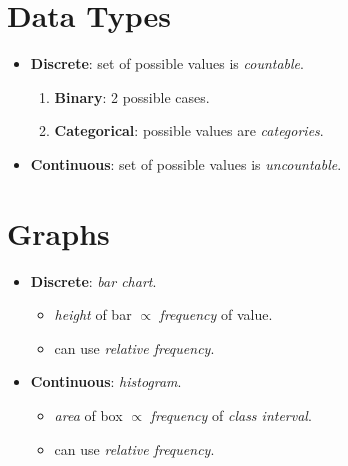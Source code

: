 \section*{Data Types}

\begin{itemize}
    \item \textbf{Discrete}: set of possible values is \textit{countable}.
    \begin{enumerate}
        \item \textbf{Binary}: 2 possible cases.
        \item \textbf{Categorical}: possible values are \textit{categories}.
    \end{enumerate}
    \item \textbf{Continuous}: set of possible values is \textit{uncountable}.
\end{itemize}

\section*{Graphs}

\begin{itemize}
    \item \textbf{Discrete}: \textit{bar chart}.
    \begin{itemize}
        \item \textit{height} of bar $\propto$ \textit{frequency} of value.
        \item can use \textit{relative frequency}.
    \end{itemize}
    \item \textbf{Continuous}: \textit{histogram}.
    \begin{itemize}
        \item \textit{area} of box $\propto$ \textit{frequency} of \textit{class interval}.
        \item can use \textit{relative frequency}.
    \end{itemize}
\end{itemize}
